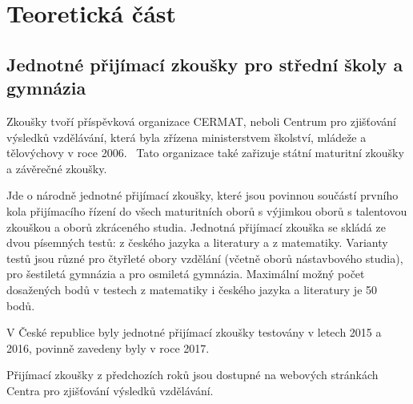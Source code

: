 \chapter{Teoretická část}


\section{Jednotné přijímací zkoušky pro střední školy a gymnázia}

Zkoušky tvoří příspěvková organizace CERMAT, neboli Centrum pro zjišťování výsledků vzdělávání, která byla zřízena ministerstvem školství, mládeže a tělovýchovy v roce 2006.~\cite{zakon_CERMAT} Tato organizace také zařizuje státní maturitní zkoušky a závěrečné zkoušky.~\cite{CERMAT_p_m}



Jde o národně jednotné přijímací zkoušky, které jsou povinnou součástí prvního kola přijímacího řízení do všech maturitních oborů s výjimkou oborů s talentovou zkouškou a oborů zkráceného studia.
Jednotná přijímací zkouška se skládá ze dvou písemných testů: z českého jazyka a literatury a z matematiky.
Varianty testů jsou různé pro čtyřleté obory vzdělání (včetně oborů nástavbového studia), pro šestiletá gymnázia a pro osmiletá gymnázia.
Maximální možný počet dosažených bodů v testech z matematiky i českého jazyka a literatury je 50 bodů.~\cite{CERMAT_co_to_je}

V České republice byly jednotné přijímací zkoušky testovány v letech 2015 a 2016, povinně zavedeny byly v roce 2017.~\cite{CERMAT_rocni_zprava}

Přijímací zkoušky z předchozích roků jsou dostupné na webových stránkách Centra pro zjišťování výsledků vzdělávání.~\cite{CERMAT_pdfka}


